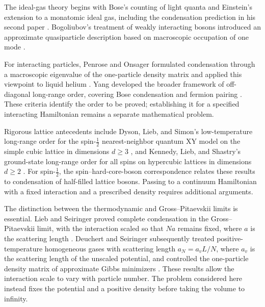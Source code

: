 The ideal-gas theory begins with Bose's counting of light quanta
\cite{Bose1924} and Einstein's extension to a monatomic ideal gas,
including the condensation prediction in his second paper
\cite{Einstein1924IdealGas,Einstein1925IdealGas}.
Bogoliubov's treatment of weakly interacting bosons introduced an
approximate quasiparticle description based on macroscopic occupation of
one mode \cite{Bogolubov1947}.

For interacting particles, Penrose and Onsager formulated condensation
through a macroscopic eigenvalue of the one-particle density matrix and
applied this viewpoint to liquid helium \cite{PenroseOnsager1956}.
Yang developed the broader framework of off-diagonal long-range order,
covering Bose condensation and fermion pairing \cite{Yang1962ODLRO}.
These criteria identify the order to be proved; establishing it for a
specified interacting Hamiltonian remains a separate mathematical problem.

Rigorous lattice antecedents include Dyson, Lieb, and Simon's
low-temperature long-range order for the spin-$\tfrac12$ nearest-neighbor
quantum XY model on the simple cubic lattice in dimensions $d\ge3$
\cite{DysonLiebSimon1978}, and Kennedy, Lieb, and Shastry's ground-state
long-range order for all spins on hypercubic lattices in dimensions $d\ge2$
\cite{KennedyLiebShastry1988XY}.
For spin-$\tfrac12$, the spin--hard-core-boson correspondence relates
these results to condensation of half-filled lattice bosons.
Passing to a continuum Hamiltonian with a fixed interaction
and a prescribed density requires additional arguments.

The distinction between the thermodynamic and Gross--Pitaevskii limits is
essential. Lieb and Seiringer proved complete condensation in the
Gross--Pitaevskii limit, with the interaction scaled so that $Na$ remains
fixed, where $a$ is the scattering length
\cite{LiebSeiringer2002BEC}. Deuchert and Seiringer subsequently treated
positive-temperature homogeneous gases with scattering length
$a_N=a_vL/N$, where $a_v$ is the scattering length of the
unscaled potential, and controlled the one-particle density matrix of approximate
Gibbs minimizers \cite{DeuchertSeiringer2020GP}. These results allow the
interaction scale to vary with particle number. The problem considered
here instead fixes the potential and a positive density before taking
the volume to infinity.


